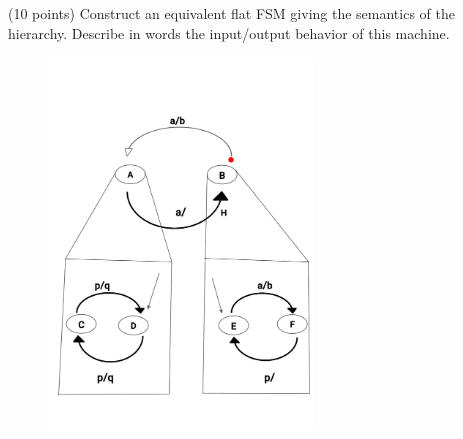 \documentclass[a4paper, 12pt]{article}
\begin{document}
\newpage
\begin{problem}{}
(10 points) Construct an equivalent flat FSM giving the semantics of the hierarchy. Describe
in words the input/output behavior of this machine. \\
\begin{figure}[h]
\begin{center}
\includegraphics[width=7cm]{image.jpg}
\end{center}
\end{figure}



\noindent
\\
\\
\begin{minipage}{1\textwidth}
		\rectangle{\linewidth}{13cm}
\end{minipage}
\newpage

\ \\
\begin{minipage}{1\textwidth}
		\rectangle{\linewidth}{24cm}
\end{minipage}
\newpage
\ \\
\begin{minipage}{1\textwidth}
		\rectangle{\linewidth}{24cm}
\end{minipage}
\newpage
\ \\
\begin{minipage}{1\textwidth}
		\rectangle{\linewidth}{24cm}
\end{minipage}
\end{problem}
\end{document}
